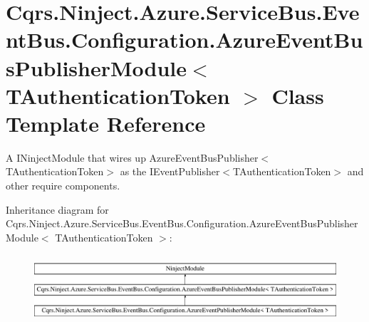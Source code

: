 \hypertarget{classCqrs_1_1Ninject_1_1Azure_1_1ServiceBus_1_1EventBus_1_1Configuration_1_1AzureEventBusPublisherModule}{}\section{Cqrs.\+Ninject.\+Azure.\+Service\+Bus.\+Event\+Bus.\+Configuration.\+Azure\+Event\+Bus\+Publisher\+Module$<$ T\+Authentication\+Token $>$ Class Template Reference}
\label{classCqrs_1_1Ninject_1_1Azure_1_1ServiceBus_1_1EventBus_1_1Configuration_1_1AzureEventBusPublisherModule}


A I\+Ninject\+Module that wires up Azure\+Event\+Bus\+Publisher$<$\+T\+Authentication\+Token$>$ as the I\+Event\+Publisher$<$\+T\+Authentication\+Token$>$ and other require components.  


Inheritance diagram for Cqrs.\+Ninject.\+Azure.\+Service\+Bus.\+Event\+Bus.\+Configuration.\+Azure\+Event\+Bus\+Publisher\+Module$<$ T\+Authentication\+Token $>$\+:\begin{figure}[H]
\begin{center}
\leavevmode
\includegraphics[height=2.530120cm]{classCqrs_1_1Ninject_1_1Azure_1_1ServiceBus_1_1EventBus_1_1Configuration_1_1AzureEventBusPublisherModule}
\end{center}
\end{figure}
